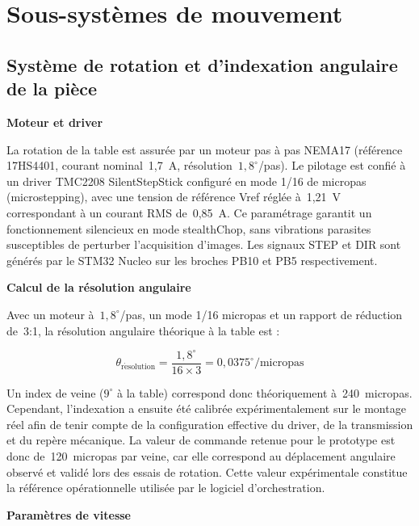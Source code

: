 \section{Sous-systèmes de mouvement}
\label{sec:mouvement}

\subsection{Système de rotation et d'indexation angulaire de la pièce}

\noindent\textbf{Moteur et driver}

La rotation de la table est assurée par un moteur pas à pas NEMA17 (référence 17HS4401,
courant nominal~1,7~A, résolution~$1{,}8^{\circ}$/pas). Le pilotage est confié à un driver
TMC2208 SilentStepStick configuré en mode 1/16 de micropas (microstepping), avec une
tension de référence Vref réglée à~1,21~V correspondant à un courant RMS de~0,85~A. Ce
paramétrage garantit un fonctionnement silencieux en mode stealthChop, sans vibrations
parasites susceptibles de perturber l'acquisition d'images. Les signaux STEP et DIR sont
générés par le STM32 Nucleo sur les broches PB10 et PB5 respectivement.

\medskip
\noindent\textbf{Calcul de la résolution angulaire}

Avec un moteur à~$1{,}8^{\circ}$/pas, un mode 1/16 micropas et un rapport de réduction de~3:1, la
résolution angulaire théorique à la table est :

\begin{equation}
\theta_{\mathrm{r\acute{e}solution}} = \frac{1{,}8^{\circ}}{16 \times 3} = 0{,}0375^{\circ}/\mathrm{micropas}
\label{eq:resolution_angulaire}
\end{equation}

Un index de veine ($9^{\circ}$ à la table) correspond donc théoriquement à~240~micropas. Cependant,
l'indexation a ensuite été calibrée expérimentalement sur le montage réel afin de tenir
compte de la configuration effective du driver, de la transmission et du repère mécanique.
La valeur de commande retenue pour le prototype est donc de~120~micropas par veine, car elle
correspond au déplacement angulaire observé et validé lors des essais de rotation. Cette
valeur expérimentale constitue la référence opérationnelle utilisée par le logiciel
d'orchestration.

\medskip
\noindent\textbf{Paramètres de vitesse}

